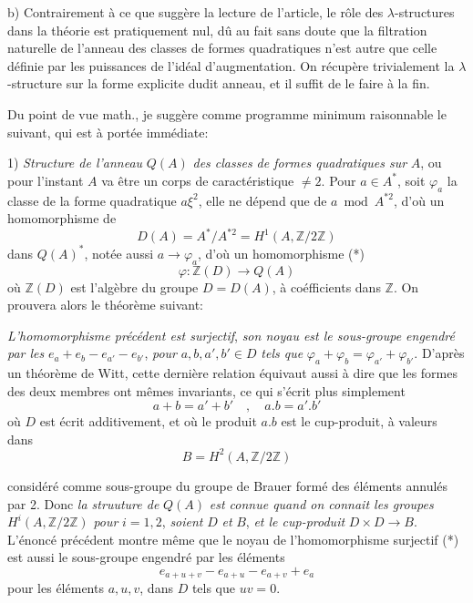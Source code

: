 \documentclass[11pt,a4paper]{article}
\begin{document}
b) Contrairement à ce que suggère la lecture de l'article, le rôle des
$\lambda$-structures dans la théorie est pratiquement nul, dû au fait sans
doute que la filtration naturelle de l'anneau des classes de formes
quadratiques n'est autre que celle définie par les puissances de l'idéal
d'augmentation. On récupère trivialement la $\lambda$-structure sur la
forme explicite dudit anneau, et il suffit de le faire à la fin.

Du point de vue math., je suggère comme programme minimum raisonnable le
suivant, qui est à portée immédiate:

1) \emph{Structure de l'anneau} $Q(A)$ \emph{des classes de formes
quadratiques sur} $A$, ou pour l'instant $A$ va être un corps de
caractéristique $\neq 2$. Pour $a \in A^{*}$, soit $\varphi_a$ la classe de
la forme quadratique $a\xi^2$, elle ne dépend que de $a \bmod A^{*2}$,
d'où un homomorphisme de
\[
D(A) = A^{*}/A^{*2} = H^1(A, \mathbb{Z}/2\mathbb{Z})
\]
dans $Q(A)^{*}$, notée aussi $a \to \varphi_a$, d'où un homomorphisme
(*) \[
\varphi : \mathbb{Z}(D) \longrightarrow Q(A)
\]
où $\mathbb{Z}(D)$ est l'algèbre du groupe $D = D(A)$, à coéfficients dans
$\mathbb{Z}$. On prouvera alors le théorème suivant:

\emph{L'homomorphisme précédent est surjectif}, \emph{son noyau est le
sous-groupe engendré par les} $e_a + e_b - e_{a'} - e_{b'}$, \emph{pour}
$a, b, a', b' \in D$ \emph{tels que} $\varphi_a + \varphi_b = \varphi_{a'}
+ \varphi_{b'}$. D'après un théorème de Witt, cette dernière relation
équivaut aussi à dire que les formes des deux membres ont mêmes
invariants, ce qui s'écrit plus simplement
\[
a + b = a' + b' \quad , \quad a.b = a'.b'
\]
où $D$ est écrit additivement, et où le produit $a.b$ est le cup-produit,
à valeurs dans
\[
B = H^2(A, \mathbb{Z}/2\mathbb{Z})
\]


considéré comme sous-groupe du groupe de Brauer formé des éléments annulés
par 2. Donc \emph{la struuture de} $Q(A)$ \emph{est connue quand on connait
les groupes} $H^i(A, \mathbb{Z}/2\mathbb{Z})$ \emph{pour} $i = 1, 2$,
\emph{soient} $D$ \emph{et} $B$, \emph{et le cup-produit} $D \times D \to
B$. L'énoncé précédent montre  même que le noyau de
l'homomorphisme surjectif (*) est aussi le sous-groupe engendré par les
éléments
\[
e_{a+u+v} - e_{a+u} - e_{a+v} + e_a
\]
pour les éléments $a, u, v$, dans $D$ tels que $uv = 0$.
\end{document}
